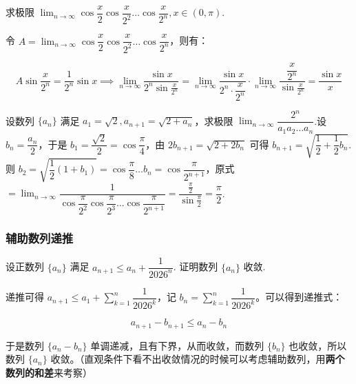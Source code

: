 \begin{exercise}[利用三角函数简化递推]

求极限 $\displaystyle \lim_{n \to \infty} \cos\dfrac{x}{2} \cos\dfrac{x}{2^2} \dots \cos\dfrac{x}{2^n}, x \in (0, \pi)$.

\end{exercise}

令 $\displaystyle A = \lim_{n \to \infty} \cos\dfrac{x}{2} \cos\dfrac{x}{2^2} \dots \cos\dfrac{x}{2^n}$，则有：

$$
\displaystyle A \sin\frac{x}{2^n} = \dfrac{1}{2^n} \sin x\implies\displaystyle \lim_{n \to \infty} \dfrac{\sin x}{2^n \sin\frac{x}{2^n}} = \lim_{n \to \infty} \dfrac{\sin x}{2^n \cdot \dfrac{x}{2^n}} \cdot \lim_{n \to \infty} \dfrac{\dfrac{x}{2^n}}{\sin\frac{x}{2^n}} = \dfrac{\sin x}{x}
$$

设数列 $\{a_n\}$ 满足 $a_1 = \sqrt{2}, a_{n+1} = \sqrt{2+a_n}$，求极限 $\displaystyle \lim_{n \to \infty} \dfrac{2^n}{a_1 a_2 \dots a_n}$.设 $\displaystyle b_n = \dfrac{a_n}{2}$，于是 $\displaystyle b_1 = \dfrac{\sqrt{2}}{2} = \cos\dfrac{\pi}{4}$，由 $\displaystyle 2b_{n+1} = \sqrt{2 + 2b_n}$ 可得 $\displaystyle b_{n+1} = \sqrt{\dfrac{1}{2} + \dfrac{1}{2} b_n}$.则 $\displaystyle b_2 = \sqrt{\dfrac{1}{2}(1 + b_1)} = \cos\dfrac{\pi}{8} \dots b_n = \cos\dfrac{\pi}{2^{n+1}}$，原式 $\displaystyle = \lim_{n \to \infty} \dfrac{1}{\cos\dfrac{\pi}{2^2} \cos\dfrac{\pi}{2^3} \dots \cos\dfrac{\pi}{2^{n+1}}} = \dfrac{\frac{\pi}{2}}{\sin\frac{\pi}{2}} = \dfrac{\pi}{2}$.

\subsubsection{辅助数列递推}

\begin{problem}

设正数列 $\displaystyle \lbrace a_n \rbrace$ 满足 $\displaystyle a_{n+1} \le a_n + \dfrac{1}{2026^n}$. 证明数列 $\displaystyle \lbrace a_n \rbrace$ 收敛.

\end{problem}

递推可得 $\displaystyle a_{n+1} \le a_1 + \sum_{k=1}^{n}\dfrac{1}{2026^k}$，记 $\displaystyle b_{n}=\sum_{k=1}^{n}\dfrac{1}{2026^k}$。可以得到递推式：

$$
a_{n+1}-b_{n+1}\leq a_{n}-b_{n}
$$

于是数列 $\displaystyle \lbrace a_n -b_{n}\rbrace$ 单调递减，且有下界，从而收敛，而数列 $\displaystyle \lbrace b_n \rbrace$ 也收敛，所以数列 $\displaystyle \lbrace a_n \rbrace$ 收敛。（直观条件下看不出收敛情况的时候可以考虑辅助数列，用\textbf{两个数列的和差}来考察）


